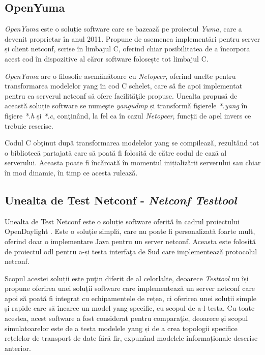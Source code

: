 \subsection{OpenYuma}

\textit{OpenYuma} este o soluție software care se bazează pe proiectul \textit{Yuma}, care a devenit proprietar în anul 2011. Propune de asemenea implementări pentru server și client \gls{netconf}, scrise în limbajul C, oferind chiar posibilitatea de a încorpora acest cod în dispozitive al căror software folosește tot limbajul C.

\textit{OpenYuma} are o filosofie asemănătoare cu \textit{Netopeer}, oferind unelte pentru transformarea modelelor \gls{yang} în cod C schelet, care să fie apoi implementat pentru ca serverul \gls{netconf} să ofere facilităţile propuse. Unealta propusă de această soluție software se numeşte \textit{yangudmp} și transformă fişierele \textit{*.yang} în fişiere \textit{*.h} și \textit{*.c}, conţinând, la fel ca în cazul \textit{Netopeer}, funcții de apel invers ce trebuie rescrise.

Codul C obţinut după transformarea modelelor \gls{yang} se compilează, rezultând tot o bibliotecă partajată care să poată fi folosită de către codul de cază al serverului. Aceasta poate fi încărcată în momentul inițializării serverului sau chiar în mod dinamic, în timp ce acesta rulează.

\subsection{Unealta de Test Netconf - \textit{Netconf Testtool}}

Unealta de Test Netconf este o soluție software oferită în cadrul proiectului OpenDaylight \cite{odlnetconftesttool}. Este o soluție simplă, care nu poate fi personalizată foarte mult, oferind doar o implementare Java pentru un server \gls{netconf}. Aceasta este folosită de proiectul \gls{odl} pentru a-și testa interfaţa de Sud care implementează protocolul \gls{netconf}.

Scopul acestei soluții este puţin diferit de al celorlalte, deoarece \textit{Testtool} nu își propune oferirea unei soluții software care implementează un server \gls{netconf} care apoi să poată fi integrat cu echipamentele de rețea, ci oferirea unei soluții simple și rapide care să încarce un model \gls{yang} specific, cu scopul de a-l testa. Cu toate acestea, acest software a fost considerat pentru comparaţie, deoarece și scopul simulatoarelor este de a testa modelele \gls{yang} și de a crea topologii specifice rețelelor de transport de date fără fir, expunând modelele informaționale descrise anterior.

